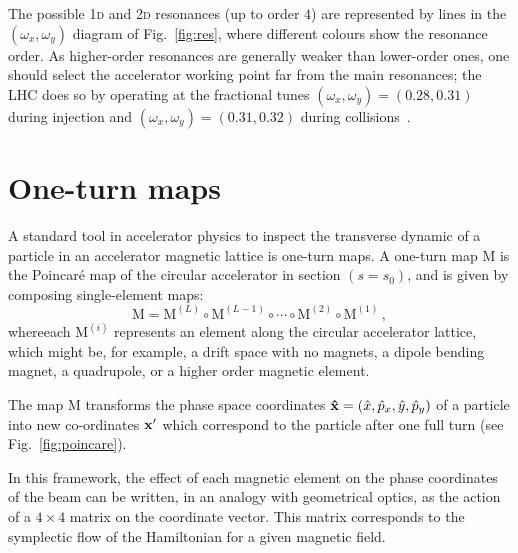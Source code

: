 The possible 1\textsc{d} and 2\textsc{d} resonances (up to order $4$) are represented by lines in the $(\omega_x, \omega_y)$ diagram of Fig.~\ref{fig:res}, where different colours show the resonance order. As higher-order resonances are generally weaker than lower-order ones, one should select the accelerator working point far from the main resonances; the LHC does so by operating at the fractional tunes $(\omega_x, \omega_y)=(0.28, 0.31)$ during injection and $(\omega_x, \omega_y)=(0.31, 0.32)$ during collisions~\cite{Benedikt:823808}.

\section{One-turn maps}

A standard tool in accelerator physics to inspect the transverse dynamic of a particle in an accelerator magnetic lattice is one-turn maps. A one-turn map \(\mathrm{M}\) is the Poincaré map of the circular accelerator in section $(s = s_0)$, and is given by composing single-element maps:
\begin{equation}
	\mathrm{M} = \mathrm{M}^{(L)} \circ \mathrm{M}^{(L - 1)} \circ \cdots \circ \mathrm{M}^{(2)} \circ \mathrm{M}^{(1)} \,,
\end{equation}
whereeach $\mathrm{M}^{(i)}$ represents an element along the circular accelerator lattice, which might be, for example, a drift space with no magnets, a dipole bending magnet, a quadrupole, or a higher order magnetic element. 

The map \(\mathrm{M}\) transforms the phase space coordinates \(\vb{\hat x} = (\hat x, \hat p_x, \hat y, \hat p_y)\) of a particle into new co-ordinates \(\vb{x}'\) which correspond to the particle after one full turn (see Fig.~\ref{fig:poincare}).

In this framework, the effect of each magnetic element on the phase coordinates of the beam can be written, in an analogy with geometrical optics, as the action of a $4\times4$ matrix on the coordinate vector. This matrix corresponds to the symplectic flow of the Hamiltonian for a given magnetic field.


